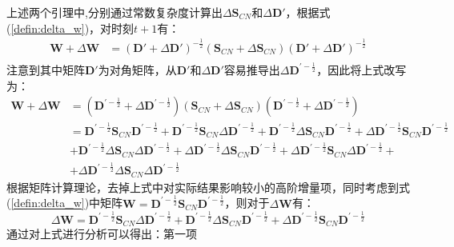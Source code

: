 上述两个引理中,分别通过常数复杂度计算出$\Delta\textbf{S}_{CN}$和$\Delta\textbf{D}'$，根据式(\ref{defin:delta_w})，对时刻$t+1$有：
\begin{equation}
	\begin{aligned}
	\textbf{W} + \Delta\textbf{W} &= (\textbf{D}'+\Delta\textbf{D}')^{-\frac{1}{2}}(\textbf{S}_{CN}+\Delta\textbf{S}_{CN})(\textbf{D}'+\Delta\textbf{D}')^{-\frac{1}{2}} \\	
	\end{aligned}
\end{equation}
注意到其中矩阵$\textbf{D}'$为对角矩阵，从$\textbf{D}'$和$\Delta\textbf{D}'$容易推导出$\Delta\textbf{D}^{\prime-\frac{1}{2}}$，因此将上式改写为：
\begin{equation}
	\begin{aligned}
	\textbf{W} + \Delta\textbf{W} &= (\textbf{D}^{\prime-\frac{1}{2}}+\Delta\textbf{D}^{\prime-\frac{1}{2}})(\textbf{S}_{CN}+\Delta\textbf{S}_{CN})(\textbf{D}^{\prime-\frac{1}{2}}+\Delta\textbf{D}^{\prime-\frac{1}{2}}) \\	
	& = \textbf{D}^{\prime-\frac{1}{2}}\textbf{S}_{CN}\textbf{D}^{\prime-\frac{1}{2}}+
	\textbf{D}^{\prime-\frac{1}{2}}\textbf{S}_{CN}\Delta\textbf{D}^{\prime-\frac{1}{2}}+
	\textbf{D}^{\prime-\frac{1}{2}}\Delta\textbf{S}_{CN}\textbf{D}^{\prime-\frac{1}{2}}+
	\Delta\textbf{D}^{\prime-\frac{1}{2}}\textbf{S}_{CN}\textbf{D}^{\prime-\frac{1}{2}}\\
	&+\textbf{D}^{\prime-\frac{1}{2}}\Delta\textbf{S}_{CN}\Delta\textbf{D}^{\prime-\frac{1}{2}}+
	\Delta\textbf{D}^{\prime-\frac{1}{2}}\Delta\textbf{S}_{CN}\textbf{D}^{\prime-\frac{1}{2}}+
	\Delta\textbf{D}^{\prime-\frac{1}{2}}\textbf{S}_{CN}\Delta\textbf{D}^{\prime-\frac{1}{2}}+\\
	&+\Delta\textbf{D}^{\prime-\frac{1}{2}}\Delta\textbf{S}_{CN}\Delta\textbf{D}^{\prime-\frac{1}{2}}
	\end{aligned}
\end{equation}
根据矩阵计算理论\cite{golub2012matrix}，去掉上式中对实际结果影响较小的高阶增量项，同时考虑到式(\ref{defin:delta_w})中矩阵$\textbf{W}= \textbf{D}^{\prime-\frac{1}{2}}\textbf{S}_{CN}\textbf{D}^{\prime-\frac{1}{2}}$，则对于$\Delta\textbf{W}$有：
\begin{equation}
	\Delta\textbf{W}= \textbf{D}^{\prime-\frac{1}{2}}\textbf{S}_{CN}\Delta\textbf{D}^{\prime-\frac{1}{2}}+
	\textbf{D}^{\prime-\frac{1}{2}}\Delta\textbf{S}_{CN}\textbf{D}^{\prime-\frac{1}{2}}+
	\Delta\textbf{D}^{\prime-\frac{1}{2}}\textbf{S}_{CN}\textbf{D}^{\prime-\frac{1}{2}}
\end{equation}
通过对上式进行分析可以得出：第一项
